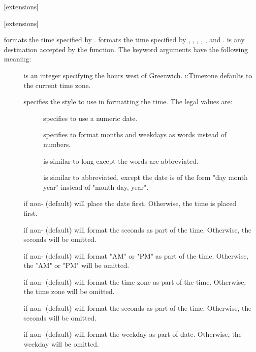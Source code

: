 [extensions]{
       }

[extensions]{
              }

 formats the time specified by .
 formats the time specified by ,
, , , , and .
 is any destination accepted by the  function.
The keyword arguments have the following meaning:
\begin{description}

\item[]
is an integer specifying the hours west of Greenwich.
\i{:Timezone} defaults to the current time zone.

\item[]
specifies the style to use in formatting the time.  The legal
values are:
\begin{description}

\item[]
specifies to use a numeric date.

\item[]
specifies to format months and weekdays as words instead of
numbers.

\item[]
is similar to long except the words are abbreviated.

\item[]
is similar to abbreviated, except the date is of the form
"day month year" instead of "month day, year".
\end{description}

\item[]
if non-\false{} (default) will place the date first.
Otherwise, the time is placed first.

\item[]
if non-\false{} (default) will format the seconds as part of
the time.  Otherwise, the seconds will be omitted.

\item[]
if non-\false{} (default) will format "AM" or "PM" as part of
the time.  Otherwise, the "AM" or "PM" will be omitted.

\item[]
if non-\false{} (default) will format the time zone as part of
the time.  Otherwise, the time zone will be omitted.

\item[]
if non-\false{} (default) will format the seconds as part of
the time.  Otherwise, the seconds will be omitted.

\item[]
if non-\false{} (default) will format the weekday as part of
date.  Otherwise, the weekday will be omitted.
\end{description}
\enddefun



